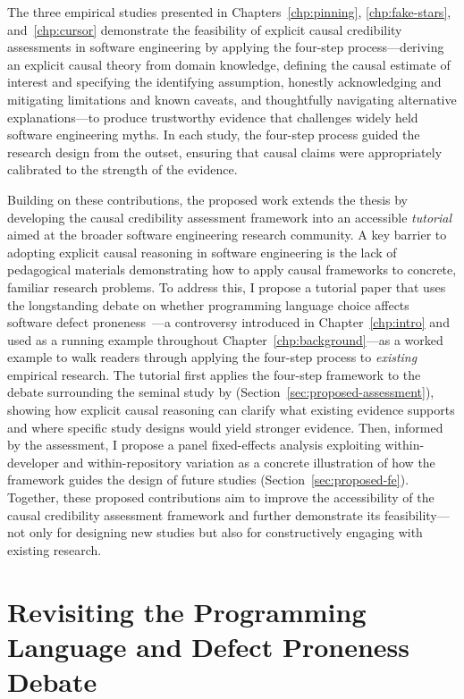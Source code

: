 The three empirical studies presented in Chapters~\ref{chp:pinning}, \ref{chp:fake-stars}, and~\ref{chp:cursor} demonstrate the feasibility of explicit causal credibility assessments in software engineering by applying the four-step process---deriving an explicit causal theory from domain knowledge, defining the causal estimate of interest and specifying the identifying assumption, honestly acknowledging and mitigating limitations and known caveats, and thoughtfully navigating alternative explanations---to produce trustworthy evidence that challenges widely held software engineering myths.
In each study, the four-step process guided the research design from the outset, ensuring that causal claims were appropriately calibrated to the strength of the evidence.

Building on these contributions, the proposed work extends the thesis by developing the causal credibility assessment framework into an accessible \emph{tutorial} aimed at the broader software engineering research community.
A key barrier to adopting explicit causal reasoning in software engineering is the lack of pedagogical materials demonstrating how to apply causal frameworks to concrete, familiar research problems.
To address this, I propose a tutorial paper that uses the longstanding debate on whether programming language choice affects software defect proneness~\cite{DBLP:conf/sigsoft/RayPFD14, DBLP:journals/cacm/RayPDF17, DBLP:journals/toplas/BergerHMVV19}---a controversy introduced in Chapter~\ref{chp:intro} and used as a running example throughout Chapter~\ref{chp:background}---as a worked example to walk readers through applying the four-step process to \emph{existing} empirical research.
The tutorial first applies the four-step framework to the debate surrounding the seminal study by \citet{DBLP:conf/sigsoft/RayPFD14} (Section~\ref{sec:proposed-assessment}), showing how explicit causal reasoning can clarify what existing evidence supports and where specific study designs would yield stronger evidence.
Then, informed by the assessment, I propose a panel fixed-effects analysis exploiting within-developer and within-repository variation as a concrete illustration of how the framework guides the design of future studies (Section~\ref{sec:proposed-fe}).
Together, these proposed contributions aim to improve the accessibility of the causal credibility assessment framework and further demonstrate its feasibility---not only for designing new studies but also for constructively engaging with existing research.

\section{Revisiting the Programming Language and Defect Proneness Debate}
\label{sec:proposed-language}

